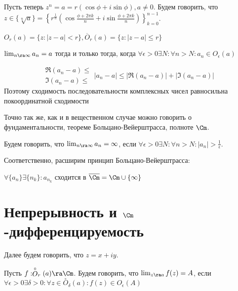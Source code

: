 Пусть теперь \(z^n = a = r(\cos \phi + i\sin \phi), a \ne 0\). Будем говорить, что \(z \in \{\sqrt[n]{a}\} = \left\{ r^{\frac{1}{n}}\left( \cos \frac{\phi + 2\pi k}{n} + i\sin \frac{\phi + 2\pi k}{n} \right) \right\}_{k = 0}^{n - 1}\).

\begin{definition}
    \(O_r(a) = \{z: |z - a| < r\}, \overline{O}_r(a) = \{z: |z - a| \le r\}\)
\end{definition}

\begin{definition}
    \(\lim_{n \ra \infty} a_n = a\) тогда и только тогда, когда \(\forall \epsilon > 0 \exists N: \forall n > N: a_n \in O_\epsilon(a)\)
\end{definition}

\begin{note}
    \[\begin{array}{c}
        \Re (a_n - a) \le \\
        \Im (a_n - a) \le
    \end{array} |a_n - a| \le |\Re (a_n - a)| + |\Im (a_n - a)|\]
    Поэтому сходимость последовательности комплексных чисел равносильна покоординатной сходимости
\end{note}

\begin{note}
    Точно так же, как и в вещественном случае можно говорить о фундаментальности, теореме Больцано-Вейерштрасса, полноте \(\Cm\).
\end{note}

\begin{definition}
    Будем говорить, что \(\lim_{n \ra \infty} a_n = \infty\), если \(\forall \epsilon > 0 \exists N: \forall n > N: |a_n| > \frac{1}{\epsilon}\).
\end{definition}

Соответственно, расширим принцип Больцано-Вейерштрасса:

\begin{proposition}
    \(\forall \{a_n\} \exists \{n_k\}: a_{n_k}\) сходится в \(\overline{\Cm} = \Cm \cup \{\infty\}\)
\end{proposition}

\section{Непрерывность и \(\Cm\)-дифференцируемость}

Далее будем говорить, что \(z = x + iy\).

\begin{definition}
    Пусть \(f: \stackrel{\circ}{O}_r(a) \ra \Cm\). Будем говорить, что \(\lim_{z \ra a} f(z) = A\), если \(\forall \epsilon > 0 \exists \delta > 0: \forall z \in \stackrel{\circ}{O}_\delta(a): f(z) \in O_\epsilon(A)\)
\end{definition}

